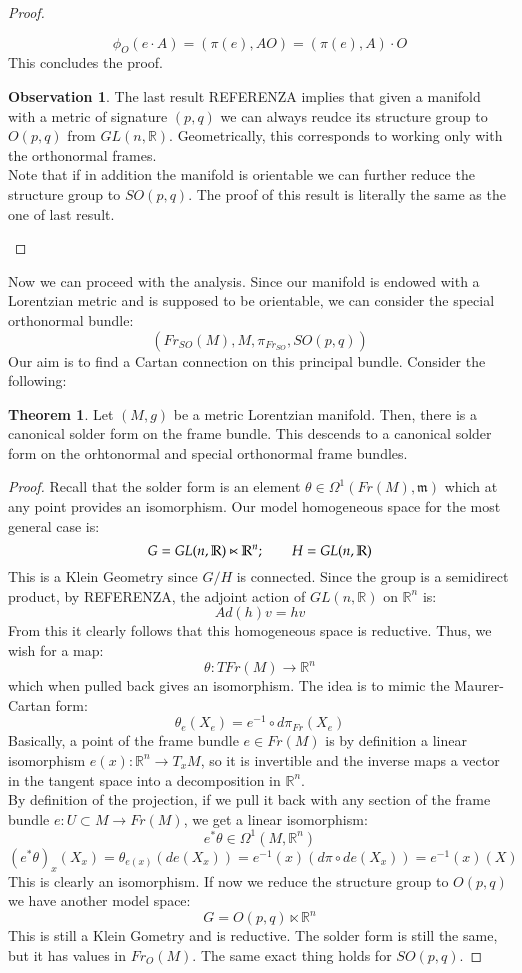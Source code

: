 \documentclass[12pt,a4paper]{report}
\theoremstyle{definition}
\theoremstyle{Theorem}
\newtheorem{Theo}[Def]{Theorem}
\theoremstyle{break}
\theoremstyle{definition}
\newtheorem{Obs}[Def]{Observation}
\begin{document}
\begin{proof}
\begin{itemize}
				$$\phi_O(e\cdot A)=(\pi(e),AO)=(\pi(e),A)\cdot O$$
				This concludes the proof.
			\end{itemize}
			\begin{Obs}
				The last result REFERENZA implies that given a manifold with a metric of signature $(p,q)$ we can always reudce its structure group to $O(p,q)$ from $GL(n,\mathbb{R})$. Geometrically, this corresponds to working only with the orthonormal frames.\\
				Note that if in addition the manifold is orientable we can further reduce the structure group to $SO(p,q)$. The proof of this result is literally the same as the one of last result.
			\end{Obs}
		\end{proof}
		Now we can proceed with the analysis. Since our manifold is endowed with a Lorentzian metric and is supposed to be orientable, we can consider the special orthonormal bundle:
		$$(Fr_{SO}(M),M,\pi_{Fr_{SO}},SO(p,q))$$
		Our aim is to find a Cartan connection on this principal bundle. Consider the following:
		\begin{Theo}
			Let $(M,g)$ be a metric Lorentzian manifold. Then, there is a canonical solder form on the frame bundle. This descends to a canonical solder form on the orhtonormal and special orthonormal frame bundles.
		\end{Theo}
		\begin{proof}
			Recall that the solder form is an element $\theta\in\Omega^1(Fr(M),\mathfrak{m})$ which at any point provides an isomorphism. Our model homogeneous space for the most general case is:
			$$G=GL(n,\mathbb{R})\ltimes\mathbb{R}^n;\hspace{20 pt}H=GL(n,\mathbb{R})$$
			This is a Klein Geometry since $G/H$ is connected. Since the group is a semidirect product, by REFERENZA, the adjoint action of $GL(n,\mathbb{R})$ on $\mathbb{R}^n$ is:
			$$Ad(h)v=hv$$
			From this it clearly follows that this homogeneous space is reductive. Thus, we wish for a map:
			$$\theta:TFr(M)\rightarrow \mathbb{R}^n$$
			which when pulled back gives an isomorphism. The idea is to mimic the Maurer-Cartan form:
			$$\theta_e(X_e)=e^{-1}\circ d\pi_{Fr}(X_e)$$
			Basically, a point of the frame bundle $e\in Fr(M)$ is by definition a linear isomorphism $e(x):\mathbb{R}^n\rightarrow T_xM$, so it is invertible and the inverse maps a vector in the tangent space into a decomposition in $\mathbb{R}^n$. \\
			By definition of the projection, if we pull it back with any section of the frame bundle $e:U\subset M\rightarrow Fr(M)$, we get a linear isomorphism:
			$$e^*\theta\in\Omega^1(M,\mathbb{R}^n)$$
			$$(e^*\theta)_x(X_x)=\theta_{e(x)}(de(X_x))=e^{-1}(x)(d\pi\circ de(X_x))=e^{-1}(x)(X)$$
			This is clearly an isomorphism. If now we reduce the structure group to $O(p,q)$ we have another model space:
			$$G=O(p,q)\ltimes \mathbb{R}^n$$
			This is still a Klein Gometry and is reductive. The solder form is still the same, but it has values in $Fr_O(M)$. The same exact thing holds for $SO(p,q)$.
		\end{proof}
\end{document}
